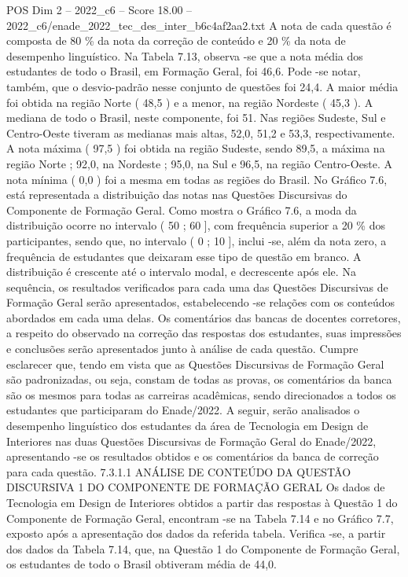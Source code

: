 \begin{textsample}{POS Dim 2 – 2022\_c6 – Score 18.00 – 2022\_c6/enade\_2022\_tec\_des\_inter\_b6c4af2aa2.txt}
A nota de cada questão é composta de 80 \% da nota da correção de conteúdo e 20 \% da nota de desempenho linguístico.
Na Tabela 7.13, observa -se que a nota média dos estudantes de todo o Brasil, em Formação Geral, foi 46,6.
Pode -se notar, também, que o desvio-padrão nesse conjunto de questões foi 24,4.
A maior média foi obtida na região Norte ( 48,5 ) e a menor, na região Nordeste ( 45,3 ).
A mediana de todo o Brasil, neste componente, foi 51.
Nas regiões Sudeste, Sul e Centro-Oeste tiveram as medianas mais altas, 52,0, 51,2 e 53,3, respectivamente.
A nota máxima ( 97,5 ) foi obtida na região Sudeste, sendo 89,5, a máxima na região Norte ; 92,0, na Nordeste ; 95,0, na Sul e 96,5, na região Centro-Oeste.
A nota mínima ( 0,0 ) foi a mesma em todas as regiões do Brasil.
No Gráfico 7.6, está representada a distribuição das notas nas Questões Discursivas do Componente de Formação Geral.
Como mostra o Gráfico 7.6, a moda da distribuição ocorre no intervalo ( 50 ; 60 ], com frequência superior a 20 \% dos participantes, sendo que, no intervalo ( 0 ; 10 ], inclui -se, além da nota zero, a frequência de estudantes que deixaram esse tipo de questão em branco.
A distribuição é crescente até o intervalo modal, e decrescente após ele.
Na sequência, os resultados verificados para cada uma das Questões Discursivas de Formação Geral serão apresentados, estabelecendo -se relações com os conteúdos abordados em cada uma delas.
Os comentários das bancas de docentes corretores, a respeito do observado na correção das respostas dos estudantes, suas impressões e conclusões serão apresentados junto à análise de cada questão.
Cumpre esclarecer que, tendo em vista que as Questões Discursivas de Formação Geral são padronizadas, ou seja, constam de todas as provas, os comentários da banca são os mesmos para todas as carreiras acadêmicas, sendo direcionados a todos os estudantes que participaram do Enade/2022.
A seguir, serão analisados o desempenho linguístico dos estudantes da área de Tecnologia em Design de Interiores nas duas Questões Discursivas de Formação Geral do Enade/2022, apresentando -se os resultados obtidos e os comentários da banca de correção para cada questão. 7.3.1.1 ANÁLISE DE CONTEÚDO DA QUESTÃO DISCURSIVA 1 DO COMPONENTE DE FORMAÇÃO GERAL Os dados de Tecnologia em Design de Interiores obtidos a partir das respostas à Questão 1 do Componente de Formação Geral, encontram -se na Tabela 7.14 e no Gráfico 7.7, exposto após a apresentação dos dados da referida tabela.
Verifica -se, a partir dos dados da Tabela 7.14, que, na Questão 1 do Componente de Formação Geral, os estudantes de todo o Brasil obtiveram média de 44,0.

\end{textsample}
